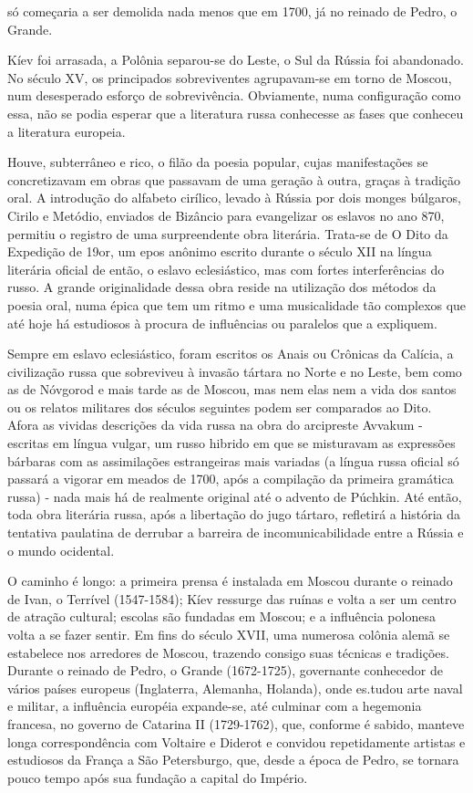 só começaria a ser demolida nada menos que em 1700, já no reinado de
Pedro, o Grande.

Kíev foi arrasada, a Polônia separou-se do Leste, o Sul da Rússia foi
abando­nado. No século XV, os principados sobreviventes agrupavam-se em
torno de Moscou, num desesperado esforço de sobrevivência. Obviamente,
numa con­figuração como essa, não se podia esperar que a literatura
russa conhecesse as fases que conheceu a literatura europeia.

Houve, subterrâneo e rico, o filão da poesia popular, cujas
manifestações se concretizavam em obras que passavam de uma geração à
outra, graças à tradi­ção oral. A introdução do alfabeto cirílico,
levado à Rússia por dois monges búlgaros, Cirilo e Metódio, enviados de
Bizâncio para evangelizar os eslavos no ano 870, permitiu o registro de
uma surpreendente obra literária. Trata-se de O Dito da Expedição de
19or, um epos anônimo escrito durante o século XII na língua literária
oficial de então, o eslavo eclesiástico, mas com fortes interfe­rências
do russo. A grande originalidade dessa obra reside na utilização dos
métodos da poesia oral, numa épica que tem um ritmo e uma musicalidade
tão complexos que até hoje há estudiosos à procura de influências ou
paralelos que a expliquem.

Sempre em eslavo eclesiástico, foram escritos os Anais ou Crônicas da
Calícia, a civilização russa que sobreviveu à invasão tártara no Norte e
no Leste, bem como as de Nóvgorod e mais tarde as de Moscou, mas nem
elas nem a vida dos santos ou os relatos militares dos séculos seguintes
podem ser comparados ao Dito. Afora as vividas descrições da vida russa
na obra do arcipreste Avvakum - escritas em língua vulgar, um russo
hibrido em que se misturavam as expres­sões bárbaras com as assimilações
estrangeiras mais variadas (a língua russa oficial só passará a vigorar
em meados de 1700, após a compilação da primeira gramática russa) - nada
mais há de realmente original até o advento de Púchkin. Até então, toda
obra literária russa, após a libertação do jugo tártaro, refletirá a
história da tentativa paulatina de derrubar a barreira de
incomunicabilidade entre a Rússia e o mundo ocidental.

O caminho é longo: a primeira prensa é instalada em Moscou durante o
rei­nado de Ivan, o Terrível (1547-1584); Kíev ressurge das ruínas e
volta a ser um centro de atração cultural; escolas são fundadas em
Moscou; e a influência po­lonesa volta a se fazer sentir. Em fins do
século XVII, uma numerosa colônia alemã se estabelece nos arredores de
Moscou, trazendo consigo suas técnicas e tradições. Durante o reinado de
Pedro, o Grande (1672-1725), governante co­nhecedor de vários países
europeus (Inglaterra, Alemanha, Holanda), onde es­.tudou arte naval e
militar, a influência européia expande-se, até culminar com a hegemonia
francesa, no governo de Catarina II (1729-1762), que, conforme é sabido,
manteve longa correspondência com Voltaire e Diderot e convidou
re­petidamente artistas e estudiosos da França a São Petersburgo, que,
desde a épo­ca de Pedro, se tornara pouco tempo após sua fundação a
capital do Império.

